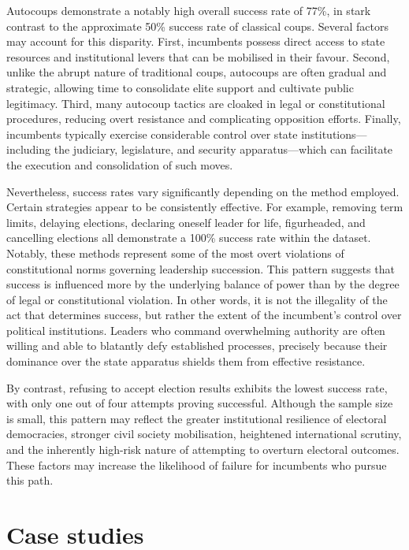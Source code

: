 \documentclass[
  12pt,
]{report}
\begin{document}
Autocoups demonstrate a notably high overall success rate of 77\%, in
stark contrast to the approximate 50\% success rate of classical coups.
Several factors may account for this disparity. First, incumbents
possess direct access to state resources and institutional levers that
can be mobilised in their favour. Second, unlike the abrupt nature of
traditional coups, autocoups are often gradual and strategic, allowing
time to consolidate elite support and cultivate public legitimacy.
Third, many autocoup tactics are cloaked in legal or constitutional
procedures, reducing overt resistance and complicating opposition
efforts. Finally, incumbents typically exercise considerable control
over state institutions---including the judiciary, legislature, and
security apparatus---which can facilitate the execution and
consolidation of such moves.

Nevertheless, success rates vary significantly depending on the method
employed. Certain strategies appear to be consistently effective. For
example, removing term limits, delaying elections, declaring oneself
leader for life, figurheaded, and cancelling elections all demonstrate a
100\% success rate within the dataset. Notably, these methods represent
some of the most overt violations of constitutional norms governing
leadership succession. This pattern suggests that success is influenced
more by the underlying balance of power than by the degree of legal or
constitutional violation. In other words, it is not the illegality of
the act that determines success, but rather the extent of the
incumbent's control over political institutions. Leaders who command
overwhelming authority are often willing and able to blatantly defy
established processes, precisely because their dominance over the state
apparatus shields them from effective resistance.

By contrast, refusing to accept election results exhibits the lowest
success rate, with only one out of four attempts proving successful.
Although the sample size is small, this pattern may reflect the greater
institutional resilience of electoral democracies, stronger civil
society mobilisation, heightened international scrutiny, and the
inherently high-risk nature of attempting to overturn electoral
outcomes. These factors may increase the likelihood of failure for
incumbents who pursue this path.

\section{Case studies}\label{case-studies}
\end{document}
